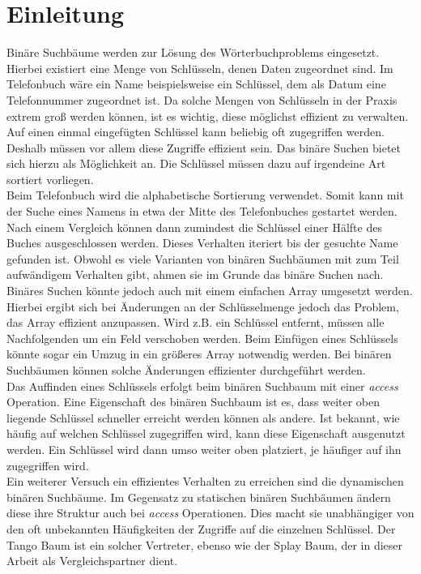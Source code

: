 \documentclass[a4paper,12pt]{article}
\begin{document}
\newpage
\section{Einleitung}
Binäre Suchbäume werden zur Lösung des Wörterbuchproblems eingesetzt. Hierbei existiert eine Menge von Schlüsseln, denen Daten zugeordnet sind. Im Telefonbuch wäre ein Name beispielsweise ein Schlüssel, dem als Datum eine Telefonnummer zugeordnet ist. Da solche Mengen von Schlüsseln in der Praxis extrem groß werden können, ist es wichtig, diese möglichst effizient zu verwalten. Auf einen einmal eingefügten Schlüssel kann beliebig oft zugegriffen werden. Deshalb müssen vor allem diese Zugriffe effizient sein. Das binäre Suchen bietet sich hierzu als Möglichkeit an. Die Schlüssel müssen dazu auf irgendeine Art sortiert vorliegen.\\ Beim Telefonbuch wird die alphabetische Sortierung verwendet. Somit kann mit der Suche eines Namens in etwa der Mitte des Telefonbuches gestartet werden. Nach einem Vergleich können dann zumindest die Schlüssel einer Hälfte des Buches ausgeschlossen werden. Dieses Verhalten iteriert bis der gesuchte Name gefunden ist. Obwohl es viele Varianten von binären Suchbäumen mit zum Teil aufwändigem Verhalten gibt, ahmen sie im Grunde das binäre Suchen nach.\\
Binäres Suchen könnte jedoch auch mit einem einfachen Array umgesetzt werden. Hierbei ergibt sich bei Änderungen an der Schlüsselmenge jedoch das Problem, das Array effizient anzupassen. Wird z.B. ein Schlüssel entfernt, müssen alle Nachfolgenden um ein Feld verschoben werden. Beim Einfügen eines Schlüssels könnte sogar ein Umzug in ein größeres Array notwendig werden. Bei binären Suchbäumen können solche Änderungen effizienter durchgeführt werden.\\ 
Das Auffinden eines Schlüssels erfolgt beim binären Suchbaum  mit einer \mbox{\textit{access}} Operation.  Eine Eigenschaft des binären Suchbaum ist es, dass weiter oben liegende Schlüssel schneller erreicht werden können als andere. Ist bekannt, wie häufig auf welchen Schlüssel zugegriffen wird, kann diese Eigenschaft ausgenutzt werden. Ein Schlüssel wird dann umso weiter oben platziert, je häufiger auf ihn zugegriffen wird. \\
Ein weiterer Versuch ein  effizientes Verhalten zu erreichen sind die dynamischen binären Suchbäume. Im Gegensatz zu statischen binären Suchbäumen ändern diese ihre Struktur auch bei \textit{access} Operationen. Dies macht sie unabhängiger von den oft unbekannten Häufigkeiten der Zugriffe auf die einzelnen Schlüssel. Der Tango Baum ist ein solcher Vertreter, ebenso wie der Splay Baum, der in dieser Arbeit als Vergleichspartner dient.
\end{document}
